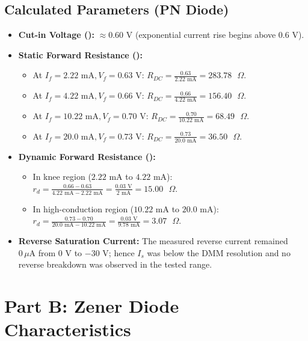 \documentclass[11pt,a4paper]{article}
\begin{document}
\subsection{Calculated Parameters (PN Diode)}
\begin{itemize}
    \item \textbf{Cut-in Voltage ():} \textbf{$\approx 0.60\text{ V}$} (exponential current rise begins above $0.6\text{ V}$).
    \item \textbf{Static Forward Resistance ():}
    \begin{itemize}
        \item At $I_f = 2.22\text{ mA}, V_f = 0.63\text{ V}$: \textbf{$R_{DC} = \frac{0.63}{2.22\text{ mA}} = 283.78\text{ }\Omega$}.
        \item At $I_f = 4.22\text{ mA}, V_f = 0.66\text{ V}$: \textbf{$R_{DC} = \frac{0.66}{4.22\text{ mA}} = 156.40\text{ }\Omega$}.
        \item At $I_f = 10.22\text{ mA}, V_f = 0.70\text{ V}$: \textbf{$R_{DC} = \frac{0.70}{10.22\text{ mA}} = 68.49\text{ }\Omega$}.
        \item At $I_f = 20.0\text{ mA}, V_f = 0.73\text{ V}$: \textbf{$R_{DC} = \frac{0.73}{20.0\text{ mA}} = 36.50\text{ }\Omega$}.
    \end{itemize}
    \item \textbf{Dynamic Forward Resistance ():}
    \begin{itemize}
        \item In knee region ($2.22\text{ mA}$ to $4.22\text{ mA}$): \textbf{$r_d = \frac{0.66 - 0.63}{4.22\text{ mA} - 2.22\text{ mA}} = \frac{0.03\text{ V}}{2\text{ mA}} = 15.00\text{ }\Omega$}.
        \item In high-conduction region ($10.22\text{ mA}$ to $20.0\text{ mA}$): \textbf{$r_d = \frac{0.73 - 0.70}{20.0\text{ mA} - 10.22\text{ mA}} = \frac{0.03\text{ V}}{9.78\text{ mA}} = 3.07\text{ }\Omega$}.
    \end{itemize}
    \item \textbf{Reverse Saturation Current:} The measured reverse current remained \textbf{$0\,\mu\text{A}$} from $0\text{ V}$ to $-30\text{ V}$; hence $I_s$ was below the DMM resolution and no reverse breakdown was observed in the tested range.
\end{itemize}

\newpage

\section{Part B: Zener Diode Characteristics}
\end{document}

